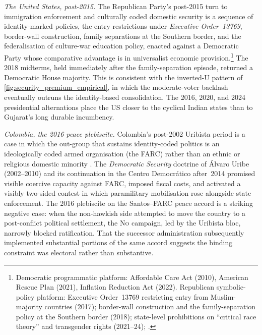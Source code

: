 \emph{The United States, post-2015.} The Republican Party's post-2015 turn
to immigration enforcement and culturally coded domestic security is a
sequence of identity-marked policies, the entry restrictions under
\emph{Executive Order~13769}, border-wall construction, family separations at the
Southern border, and the federalisation of culture-war education policy, 
enacted against a Democratic Party whose comparative advantage is in
universalist economic provision.\footnote{Democratic programmatic platform:
Affordable Care Act (2010), American Rescue Plan (2021), Inflation Reduction
Act (2022). Republican symbolic-policy platform: Executive Order~13769
restricting entry from Muslim-majority countries (2017); border-wall
construction and the family-separation policy at the Southern border
(2018); state-level prohibitions on ``critical race theory'' and
transgender rights (2021--24); \citealt*{handan-naderPolarizationStateLegislative2025}.} The 2018 midterms, held immediately after
the family-separation episode, returned a Democratic House majority.
This is consistent with the inverted-U pattern of
\autoref{fig:security_premium_empirical}, in which the moderate-voter
backlash eventually outruns the identity-based consolidation. The 2016,
2020, and 2024 presidential alternations place the US closer to the
cyclical Indian states than to Gujarat's long durable incumbency.

\emph{Colombia, the 2016 peace plebiscite.} Colombia's post-2002 Uribista
period is a case in which the out-group that sustains identity-coded
politics is an ideologically coded armed organisation (the FARC) rather
than an ethnic or religious domestic minority \citep*{acostaFabricatingCommunistsImagined2025}. The \emph{Democratic
Security} doctrine of Álvaro Uribe (2002--2010) and its continuation in
the Centro Democrático after~2014 promised visible coercive capacity
against FARC, imposed fiscal costs, and activated a visibly two-sided
contest in which paramilitary mobilisation rose alongside state
enforcement. The 2016 plebiscite on the Santos--FARC peace accord is a
striking negative case: when the non-hawkish side attempted to move the
country to a post-conflict political settlement, the \textsc{No} campaign,
led by the Uribista bloc, narrowly blocked ratification. That the
successor administration subsequently implemented substantial portions of
the same accord suggests the binding constraint was electoral rather than
substantive.

